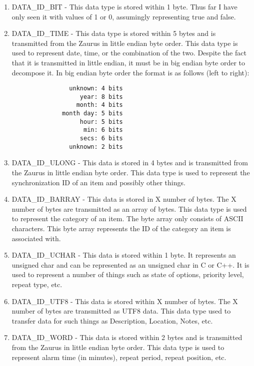     \begin{enumerate}
    \item DATA\_ID\_BIT - This data type is stored within 1 byte. Thus far I
    have only seen it with values of 1 or 0, assumingly representing true and
    false.

    \item DATA\_ID\_TIME - This data type is stored within 5 bytes and is
    transmitted from the Zaurus in little endian byte order. This data type is
    used to represent date, time, or the combination of the two. Despite the
    fact that it is transmitted in little endian, it must be in big endian byte
    order to decompose it. In big endian byte order the format is as follows
    (left to right):

\begin{verbatim}
                unknown: 4 bits
                   year: 8 bits
                  month: 4 bits
              month day: 5 bits
                   hour: 5 bits
                    min: 6 bits
                   secs: 6 bits
                unknown: 2 bits
\end{verbatim}

    \item DATA\_ID\_ULONG - This data is stored in 4 bytes and is transmitted
    from the Zaurus in little endian byte order. This data type is used to
    represent the synchronization ID of an item and possibly other things.

    \item DATA\_ID\_BARRAY - This data is stored in X number of bytes. The X
    number of bytes are transmitted as an array of bytes. This data type is
    used to represent the category of an item. The byte array only consists of
    ASCII characters. This byte array represents the ID of the category an
    item is associated with.

    \item DATA\_ID\_UCHAR - This data is stored within 1 byte. It represents
    an unsigned char and can be represented as an unsigned char in C or
    C++. It is used to represent a number of things such as state of options,
    priority level, repeat type, etc.

    \item DATA\_ID\_UTF8 - This data is stored within X number of bytes. The X
    number of bytes are transmitted as UTF8 data. This data type used to
    transfer data for such things as Description, Location, Notes, etc.

    \item DATA\_ID\_WORD - This data is stored within 2 bytes and is
    transmitted from the Zaurus in little endian byte order. This data type is
    used to represent alarm time (in minutes), repeat period, repeat position,
    etc.

    \end{enumerate}

